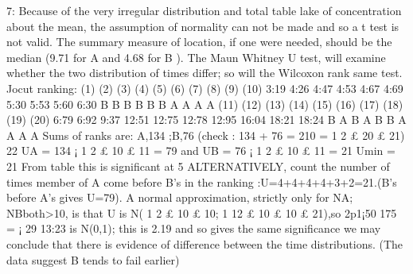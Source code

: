 7:
Because of the very irregular distribution and total table lake of concentration
about the mean, the assumption of normality can not be made and so a t test is not
valid. The summary measure of location, if one were needed, should be the median
(9.71 for A and 4.68 for B ). The Maun Whitney U test, will examine whether the two
distribution of times differ; so will the Wilcoxon rank same test.
Jocut ranking:
(1) (2) (3) (4) (5) (6) (7) (8) (9) (10)
3:19 4:26 4:47 4:53 4:67 4:69 5:30 5:53 5:60 6:30
B B B B B B A A A A
(11) (12) (13) (14) (15) (16) (17) (18) (19) (20)
6:79 6:92 9:37 12:51 12:75 12:78 12:95 16:04 18:21 18:24
B A B A B B A A A A
Sums of ranks are: A,134 ;B,76 (check : 134 + 76 = 210 = 1
2 £ 20 £ 21)
22
UA = 134 ¡
1
2
£ 10 £ 11 = 79 and UB = 76 ¡
1
2
£ 10 £ 11 = 21 Umin = 21
From table this is significant at 5%
ALTERNATIVELY, count the number of times member of A come before B’s in the
ranking :U=4+4+4+4+3+2=21.(B’s before A’s gives U=79). A normal approximation,
strictly only for NA; NBboth>10, is that U is N( 1
2 £ 10 £ 10; 1
12 £ 10 £ 10 £ 21),so
2p1¡50
175 = ¡ 29
13:23 is N(0,1); this is 2.19 and so gives the same significance
we may conclude that there is evidence of difference between the time distributions.
(The data suggest B tends to fail earlier)
